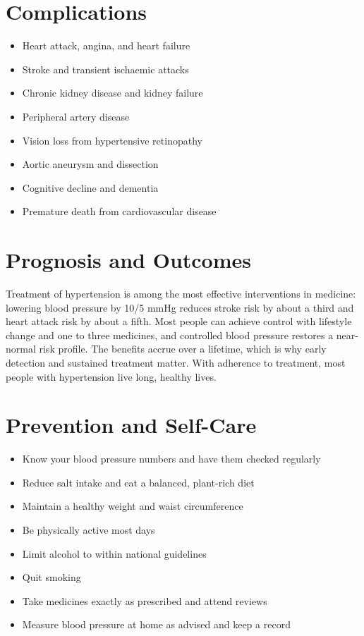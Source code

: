 \section*{Complications}
\begin{itemize}
    \item Heart attack, angina, and heart failure
    \item Stroke and transient ischaemic attacks
    \item Chronic kidney disease and kidney failure
    \item Peripheral artery disease
    \item Vision loss from hypertensive retinopathy
    \item Aortic aneurysm and dissection
    \item Cognitive decline and dementia
    \item Premature death from cardiovascular disease
\end{itemize}

\section*{Prognosis and Outcomes}
Treatment of hypertension is among the most effective interventions in medicine: lowering blood pressure by 10/5 mmHg reduces stroke risk by about a third and heart attack risk by about a fifth. Most people can achieve control with lifestyle change and one to three medicines, and controlled blood pressure restores a near-normal risk profile. The benefits accrue over a lifetime, which is why early detection and sustained treatment matter. With adherence to treatment, most people with hypertension live long, healthy lives.

\section*{Prevention and Self-Care}
\begin{itemize}
    \item Know your blood pressure numbers and have them checked regularly
    \item Reduce salt intake and eat a balanced, plant-rich diet
    \item Maintain a healthy weight and waist circumference
    \item Be physically active most days
    \item Limit alcohol to within national guidelines
    \item Quit smoking
    \item Take medicines exactly as prescribed and attend reviews
    \item Measure blood pressure at home as advised and keep a record
\end{itemize}

